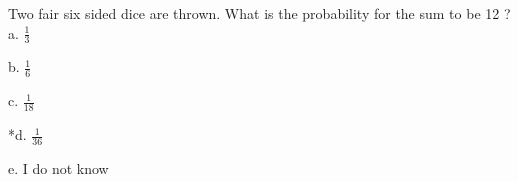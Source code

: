 
Two fair six sided dice are thrown. What is the probability for the
sum to be 12 ? \\

a. \(\frac{1}{3}\)

b. \(\frac{1}{6}\)

c. \(\frac{1}{18}\)

*d. \(\frac{1}{36}\)

e. I do not know \\
